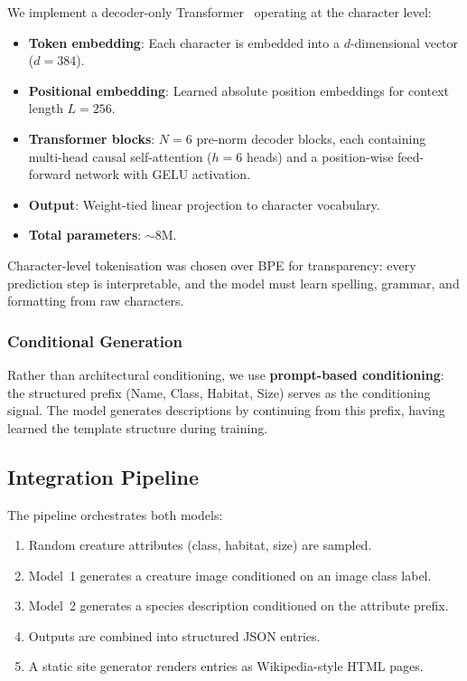 \documentclass[12pt,a4paper]{article}
\begin{document}
We implement a decoder-only Transformer~\cite{radford2019language} operating at the character level:
\begin{itemize}
    \item \textbf{Token embedding}: Each character is embedded into a $d$-dimensional vector ($d=384$).
    \item \textbf{Positional embedding}: Learned absolute position embeddings for context length $L=256$.
    \item \textbf{Transformer blocks}: $N=6$ pre-norm decoder blocks, each containing multi-head causal self-attention ($h=6$ heads) and a position-wise feed-forward network with GELU activation.
    \item \textbf{Output}: Weight-tied linear projection to character vocabulary.
    \item \textbf{Total parameters}: $\sim$8M.
\end{itemize}

Character-level tokenisation was chosen over BPE for transparency: every prediction step is interpretable, and the model must learn spelling, grammar, and formatting from raw characters.

\subsubsection{Conditional Generation}

Rather than architectural conditioning, we use \textbf{prompt-based conditioning}: the structured prefix (Name, Class, Habitat, Size) serves as the conditioning signal. The model generates descriptions by continuing from this prefix, having learned the template structure during training.

\subsection{Integration Pipeline}

The pipeline orchestrates both models:
\begin{enumerate}
    \item Random creature attributes (class, habitat, size) are sampled.
    \item Model~1 generates a creature image conditioned on an image class label.
    \item Model~2 generates a species description conditioned on the attribute prefix.
    \item Outputs are combined into structured JSON entries.
    \item A static site generator renders entries as Wikipedia-style HTML pages.
\end{enumerate}
\end{document}
